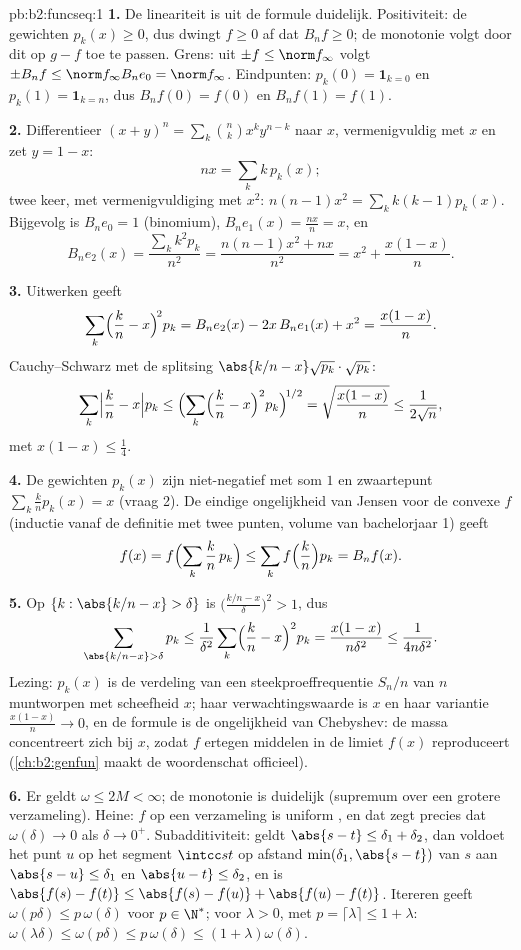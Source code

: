 \begin{solution}{pb:b2:funcseq:1}
\textbf{1.} De lineariteit is uit de formule duidelijk.
Positiviteit: de gewichten $p_k(x) \geq 0$, dus dwingt $f \geq 0$
af dat $B_nf \geq 0$; de monotonie volgt door dit op $g - f$ toe te
passen. Grens: uit $\pm f \leq \norm f_\infty$ volgt $\pm B_nf \leq
\norm f_\infty B_ne_0 = \norm f_\infty$. Eindpunten: $p_k(0) =
\mathbf 1_{k=0}$ en $p_k(1) = \mathbf 1_{k=n}$, dus $B_nf(0) =
f(0)$ en $B_nf(1) = f(1)$.

\textbf{2.} Differentieer $(x+y)^n = \sum_k\binom nk x^ky^{n-k}$
naar $x$, vermenigvuldig met $x$ en zet $y = 1 - x$:
\[
nx = \sum_k k\,p_k(x) ;
\]
twee keer, met vermenigvuldiging met $x^2$: $n(n-1)x^2 = \sum_k
k(k-1)p_k(x)$. Bijgevolg is $B_ne_0 = 1$ (binomium), $B_ne_1(x) =
\frac{nx}{n} = x$, en
\[
B_ne_2(x) = \frac{\sum_k k^2p_k}{n^2}
= \frac{n(n-1)x^2 + nx}{n^2}
= x^2 + \frac{x(1-x)}{n} .
\]

\textbf{3.} Uitwerken geeft
\[
\sum_k\Bigl(\frac kn - x\Bigr)^{\!2} p_k
= B_ne_2(x) - 2x\,B_ne_1(x) + x^2
= \frac{x(1-x)}{n} .
\]
Cauchy--Schwarz met de splitsing $\abs{k/n - x}\sqrt{p_k} \cdot
\sqrt{p_k}$:
\[
\sum_k\Bigl|\frac kn - x\Bigr| p_k
\leq \Bigl(\sum_k\Bigl(\frac kn - x\Bigr)^2
p_k\Bigr)^{\!1/2}
= \sqrt{\frac{x(1-x)}{n}} \leq \frac{1}{2\sqrt n},
\]
met $x(1-x) \leq \frac14$.

\textbf{4.} De gewichten $p_k(x)$ zijn niet-negatief met som $1$ en
zwaartepunt $\sum_k \frac kn p_k(x) = x$ (vraag 2). De eindige
ongelijkheid van Jensen voor de convexe $f$ (inductie vanaf de
definitie met twee punten, volume van bachelorjaar 1) geeft
\[
f(x) = f\Bigl(\sum_k \frac kn\,p_k\Bigr)
\leq \sum_k f\Bigl(\frac kn\Bigr)p_k = B_nf(x) .
\]

\textbf{5.} Op $\{k : \abs{k/n - x} > \delta\}$ is
$\bigl(\frac{k/n - x}{\delta}\bigr)^2 > 1$, dus
\[
\sum_{\abs{k/n-x}>\delta} p_k
\leq \frac{1}{\delta^2}\sum_k\Bigl(\frac kn -
x\Bigr)^2p_k
= \frac{x(1-x)}{n\delta^2} \leq \frac{1}{4n\delta^2} .
\]
Lezing: $p_k(x)$ is de verdeling van een steekproeffrequentie
$S_n/n$ van $n$ muntworpen met scheefheid $x$; haar
verwachtingswaarde is $x$ en haar variantie $\frac{x(1-x)}n \to 0$,
en de formule is de ongelijkheid van Chebyshev: de massa
concentreert zich bij $x$, zodat $f$ ertegen middelen in de limiet
$f(x)$ reproduceert (\cref{ch:b2:genfun} maakt de woordenschat
officieel).

\textbf{6.} Er geldt $\omega \leq 2M < \infty$; de monotonie is
duidelijk (supremum over een grotere verzameling). Heine: $f$
 op een  verzameling is uniform , en dat zegt
precies dat $\omega(\delta) \to 0$ als $\delta \to 0^+$.
Subadditiviteit: geldt $\abs{s - t} \leq \delta_1 + \delta_2$, dan
voldoet het punt $u$ op het segment $\intcc st$ op afstand
$\min(\delta_1, \abs{s-t})$ van $s$ aan $\abs{s-u} \leq \delta_1$
en $\abs{u-t} \leq \delta_2$, en is $\abs{f(s)-f(t)} \leq
\abs{f(s)-f(u)} + \abs{f(u)-f(t)}$. Itereren geeft
$\omega(p\delta) \leq p\,\omega(\delta)$ voor $p \in \N^*$; voor
$\lambda > 0$, met $p = \lceil\lambda\rceil \leq 1 + \lambda$:
$\omega(\lambda\delta) \leq \omega(p\delta) \leq p\,\omega(\delta)
\leq (1+\lambda)\omega(\delta)$.


\end{solution}
